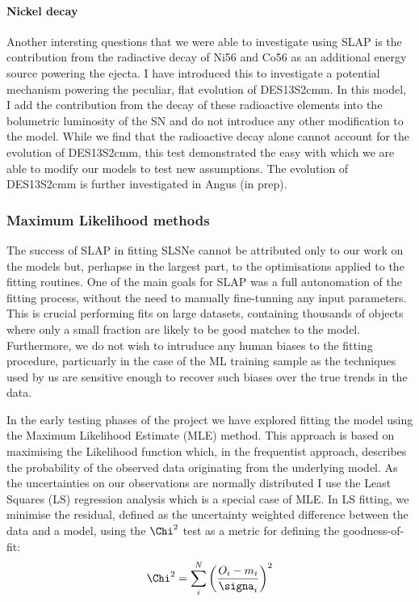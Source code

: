 \paragraph{Nickel decay}
Another intersting questions that we were able to investigate using \textsc{SLAP} is the contribution from the radiactive decay of Ni56 and Co56 as an additional energy source powering the ejecta. I have introduced this to investigate a potential mechanism powering the peculiar, flat evolution of DES13S2cmm. In this model, I add the contribution from the decay of these radioactive elements into the bolumetric luminosity of the SN and do not introduce any other modification to the model. While we find that the radioactive decay alone cannot account for the evolution of DES13S2cmm, this test demonstrated the easy with which we are able to modify our models to test new assumptions. The evolution of DES13S2cmm is further investigated in Angus (in prep).

\subsubsection{Maximum Likelihood methods}
The success of \textsc{SLAP} in fitting SLSNe cannot be attributed only to our work on the models but, perhapse in the largest part, to the optimisations applied to the fitting routines. One of the main goals for \textsc{SLAP} was a full autonomation of the fitting process, without the need to manually fine-tunning any input parameters. This is crucial performing fits on large datasets, containing thousands of objects where only a small fraction are likely to be good matches to the model. Furthermore, we do not wish to intruduce any human biases to the fitting procedure, particuarly in the case of the ML training sample as the techniques used by us are sensitive enough to recover such biases over the true trends in the data.

In the early testing phases of the project we have explored fitting the model using the Maximum Likelihood Estimate (MLE) method. This approach is based on maximising the Likelihood function which, in the frequentist approach, describes the probability of the observed data originating from the underlying model. As the uncertainties on our observations are normally distributed I use the Least Squares (LS) regression analysis which is a special case of MLE. In LS fitting, we minimise the residual, defined as the uncertainty weighted difference between the data and a model, using the $\Chi^{2}$ test as a metric for defining the goodness-of-fit:
\begin{equation}
  \Chi^2 = \sum\limits_i^N \left( \frac{O_i - m_i}{\signa_i} \right)^2
\end{equation}

